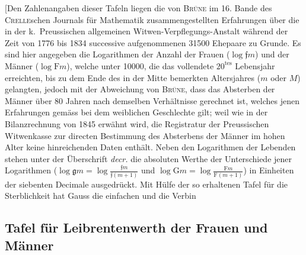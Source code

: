 \documentclass[12pt,a4paper]{article}
\begin{document}
[Den Zahlenangaben dieser Tafeln liegen die von \textsc{Brüne} im 16. Bande des \textsc{Crelle}schen Journals für Mathematik zusammengestellten Erfahrungen über die in der k.~Preussischen allgemeinen Witwen-Verpflegungs-Anstalt während der Zeit von 1776 bis 1834 successive aufgenommenen 31500 Ehepaare zu Grunde. Es sind hier angegeben die Logarithmen der Anzahl der Frauen ($\log \mathfrak{f}m$) und der Männer ($\log \mathrm{F}m$), welche unter 10000, die das vollendete $20^{\text{tes}}$ Lebensjahr erreichten, bis zu dem Ende des in der Mitte bemerkten Altersjahres ($m$ oder $M$) gelangten, jedoch mit der Abweichung von \textsc{Brüne}, dass das Absterben der Männer über 80 Jahren nach demselben Verhältnisse gerechnet ist, welches jenen Erfahrungen gemäss bei dem weiblichen Geschlechte gilt; weil wie in der Bilanzrechnung von 1845 erwähnt wird, die Registratur der Preussischen Witwenkasse zur directen Bestimmung des Absterbens der Männer im hohen Alter keine hinreichenden Daten enthält. Neben den Logarithmen der Lebenden stehen unter der Überschrift \textit{decr.} die absoluten Werthe der Unterschiede jener Logarithmen ($\log \mathfrak{g}m = \log \frac{\mathfrak{f}m}{\mathfrak{f}(m+1)}$ und $\log \mathrm{G}m = \log \frac{\mathrm{F}m}{\mathrm{F}(m+1)}$) in Einheiten der siebenten Decimale ausgedrückt. Mit Hülfe der so erhaltenen Tafel für die Sterblichkeit hat Gauss die einfachen und die Verbin

\subsection*{Tafel für Leibrentenwerth der Frauen und Männer}
\end{document}
